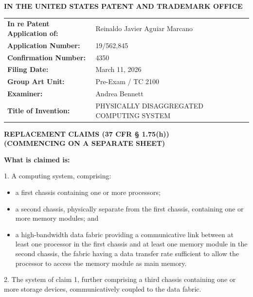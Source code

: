\documentclass[11pt,letterpaper]{article}
\begin{document}
\thispagestyle{empty}

\begin{center}
    \large\textbf{IN THE UNITED STATES PATENT AND TRADEMARK OFFICE} \\
\end{center}

\vspace{0.1cm}
\noindent\begin{tabular}{p{2.3in}p{4.0in}}
\textbf{In re Patent Application of:} & Reinaldo Javier Aguiar Marcano \\
\textbf{Application Number:} & 19/562,845 \\
\textbf{Confirmation Number:} & 4350 \\
\textbf{Filing Date:} & March 11, 2026 \\
\textbf{Group Art Unit:} & Pre-Exam / TC 2100 \\
\textbf{Examiner:} & Andrea Bennett \\
\textbf{Title of Invention:} & PHYSICALLY DISAGGREGATED COMPUTING SYSTEM \\
\end{tabular}

\vspace{0.3cm}
\begin{center}
    \textbf{\large REPLACEMENT CLAIMS (37 CFR \S{} 1.75(h))} \\
    \textbf{(COMMENCING ON A SEPARATE SHEET)}
\end{center}

\vspace{0.2cm}

\textbf{What is claimed is:}

1. A computing system, comprising:
\begin{itemize}[leftmargin=2.5em]
    \item[] a first chassis containing one or more processors;
    \item[] a second chassis, physically separate from the first chassis, containing one or more memory modules; and
    \item[] a high-bandwidth data fabric providing a communicative link between at least one processor in the first chassis and at least one memory module in the second chassis, the fabric having a data transfer rate sufficient to allow the processor to access the memory module as main memory.
\end{itemize}

2. The system of claim 1, further comprising a third chassis containing one or more storage devices, communicatively coupled to the data fabric.
\end{document}

